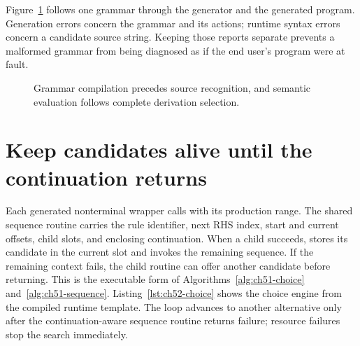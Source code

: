 Figure~\ref{fig:ch52-pipeline} follows one grammar through the generator and the generated program.
Generation errors concern the grammar and its actions; runtime syntax errors concern a candidate source string.
Keeping those reports separate prevents a malformed grammar from being diagnosed as if the end user's program were at fault.

\begin{figure}[htbp]
\centering
{}
\caption{Grammar compilation precedes source recognition, and semantic evaluation follows complete derivation selection.}
\label{fig:ch52-pipeline}
\end{figure}

\section{Keep candidates alive until the continuation returns}
\label{sec:ch52-runtime}

Each generated nonterminal wrapper calls  with its production range.
The shared sequence routine carries the rule identifier, next RHS index, start and current offsets, child slots, and enclosing continuation.
When a child succeeds,  stores its candidate in the current slot and invokes the remaining sequence.
If the remaining context fails, the child routine can offer another candidate before returning.
This is the executable form of Algorithms~\ref{alg:ch51-choice} and~\ref{alg:ch51-sequence}.
Listing~\ref{lst:ch52-choice} shows the choice engine from the compiled runtime template.
The loop advances to another alternative only after the continuation-aware sequence routine returns failure; resource failures stop the search immediately.

\begin{listing}[htbp]
\inputminted[firstline=242,lastline=253]{c}{support/aurocks-runtime.c}
\caption{The generated C choice engine retries complete continuations and propagates resource failures separately from syntax failure.}
\label{lst:ch52-choice}
\end{listing}

